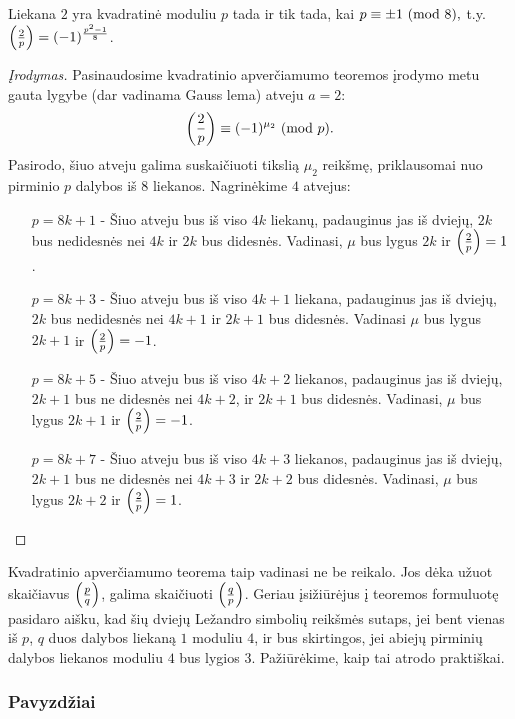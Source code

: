 \begin{thm} Liekana $2$ yra kvadratinė moduliu $p$ tada ir tik tada, kai
  $p\equiv \pm1 \ (\text{mod } 8),$ t.y. $\left(\frac{2}{p}\right) = (-1)^\frac{p^2 -1}{8}$.
\end{thm}

\begin{proof}[Įrodymas]
  Pasinaudosime kvadratinio apverčiamumo teoremos įrodymo metu gauta lygybe
  (dar vadinama Gauss lema) atveju $a=2$:
  $$\left(\frac{2}{p}\right) \equiv (-1)^{\mu_2} \ (\text{mod } p).$$
  Pasirodo, šiuo atveju galima suskaičiuoti tikslią $\mu_2$ reikšmę,
  priklausomai nuo pirminio $p$ dalybos iš $8$ liekanos. Nagrinėkime $4$
  atvejus:

  \begin{itemize}
    \item[$p = 8k + 1$ - ] Šiuo atveju bus iš viso $4k$ liekanų, padauginus
      jas iš dviejų, $2k$ bus nedidesnės nei $4k$ ir $2k$ bus didesnės.
      Vadinasi, $\mu$ bus lygus $2k$ ir $\left(\frac{2}{p}\right) = 1$.
    \item[$p = 8k + 3$ - ] Šiuo atveju bus iš viso $4k + 1$ liekana,
      padauginus jas iš dviejų, $2k$ bus nedidesnės nei $4k+1$ ir $2k+1$ bus
      didesnės. Vadinasi $\mu$ bus lygus $2k+1$ ir $\left(\frac{2}{p}\right) = -1$.
    \item[$p = 8k + 5$ - ] Šiuo atveju bus iš viso $4k + 2$ liekanos,
      padauginus jas iš dviejų, $2k+1$ bus ne didesnės nei $4k+2$, ir $2k+1$
      bus didesnės. Vadinasi, $\mu$ bus lygus $2k+1$ ir $\left(\frac{2}{p}\right) = -1$.
    \item[$p = 8k + 7$ - ] Šiuo atveju bus iš viso $4k + 3$ liekanos,
      padauginus jas iš dviejų, $2k+1$ bus ne didesnės nei $4k+3$ ir $2k+2$
      bus didesnės. Vadinasi, $\mu$ bus lygus $2k+2$ ir $\left(\frac{2}{p}\right) = 1$.  
  \end{itemize}
\end{proof}

Kvadratinio apverčiamumo teorema taip vadinasi ne be reikalo. Jos dėka
užuot skaičiavus $\left(\frac{p}{q}\right)$, galima skaičiuoti $\left(\frac{q}{p}\right)$. Geriau
įsižiūrėjus į teoremos formuluotę pasidaro aišku, kad šių dviejų Ležandro
simbolių reikšmės sutaps, jei bent vienas iš $p$, $q$ duos dalybos liekaną
$1$ moduliu $4$, ir bus skirtingos, jei abiejų pirminių dalybos liekanos
moduliu $4$ bus lygios $3$. Pažiūrėkime, kaip tai atrodo praktiškai.

\subsubsection{Pavyzdžiai}

